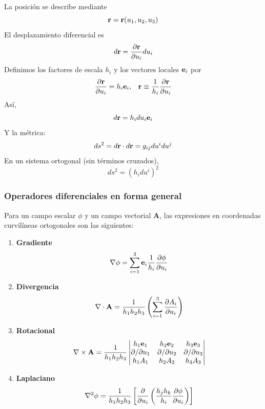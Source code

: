 \documentclass[]{article}
\numberwithin{equation}{section}
\begin{document}
La posición se describe mediante
\begin{equation}
	\mathbf{r} = \mathbf{r}(u_1, u_2, u_3)
\end{equation}
El desplazamiento diferencial es
\begin{equation}
	d\mathbf{r} = \frac{\partial\mathbf{r}}{\partial u_i}du_i
\end{equation}
Definimos los factores de escala \(h_i\) y los vectores locales \(\mathbf{e}_i\) por
\begin{equation}
	\begin{matrix}
		\dfrac{\partial\mathbf{r}}{\partial u_i} = h_i\mathbf{e}_i, & \mathbf{r} \equiv \dfrac{1}{h_i}\dfrac{\partial\mathbf{r}}{\partial u_i}
	\end{matrix}
\end{equation}
Así,
\begin{equation}
	d\mathbf{r} = h_i du_i \mathbf{e}_i
\end{equation}
Y la métrica:
\begin{equation}
	ds^2 = d\mathbf{r}\cdot d\mathbf{r} = g_{ij}du^idu^j
\end{equation}
En un sistema ortogonal (sin términos cruzados),
\begin{equation}
	ds^2 = (h_idu^i)^2
\end{equation}

\subsubsection{Operadores diferenciales en forma general}
Para un campo escalar \(\phi\) y un campo vectorial \(\mathbf{A}\), las expresiones en coordenadas curvilíneas ortogonales son las siguientes:
\begin{enumerate}
	\item \textbf{Gradiente}
	\begin{equation}
		\nabla\phi = \sum_{i=1}^{3}\mathbf{e}_i\frac{1}{h_i}\frac{\partial\phi}{\partial u_i}
	\end{equation}
	\item \textbf{Divergencia}
	\begin{equation}
		\nabla\cdot\mathbf{A} = \frac{1}{h_1h_2h_3}\left(\sum_{i=1}^{3}\frac{\partial A_i}{\partial u_i}\right) 
	\end{equation}
	\item \textbf{Rotacional}
	\begin{equation}
		\nabla\times\mathbf{A} = \frac{1}{h_1h_2h_3}\begin{vmatrix}
			h_1\mathbf{e}_1 & h_2\mathbf{e}_2 & h_3\mathbf{e}_3\\
			\partial/\partial u_1 & \partial/\partial u_2 & \partial/\partial u_3\\
			h_1A_1 & h_2A_2 & h_3A_3
		\end{vmatrix}
	\end{equation}
	\item \textbf{Laplaciano}
	\begin{equation}
		\nabla^2\phi = \frac{1}{h_1h_2h_3}\left[\frac{\partial}{\partial u_i}\left(\frac{h_j h_k}{h_i}\frac{\partial\phi}{\partial u_i}\right) \right]
	\end{equation}
\end{enumerate}
\end{document}
